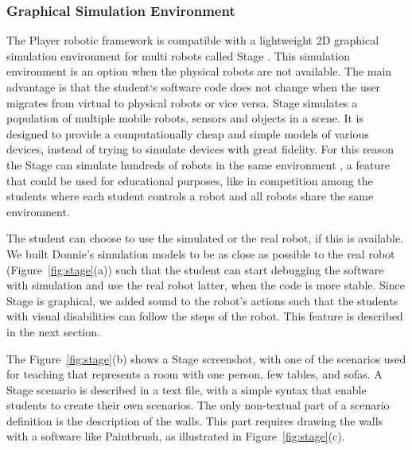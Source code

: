 


\subsubsection{Graphical Simulation Environment}
\label{sec:simul}

The Player robotic framework is compatible with a lightweight 2D graphical simulation environment for multi robots called Stage \cite{Vaughan:2008}. This simulation environment is an option when the physical robots are not available. The main advantage is that the student`s software code does not change when the user migrates from virtual to physical robots or vice versa.
Stage simulates a population of multiple mobile robots, sensors and objects in a scene. It is designed to provide a computationally cheap and simple models of various devices, instead of trying to simulate devices with great fidelity. For this reason the Stage can simulate hundreds of robots in the same environment \cite{Vaughan:2008}, a feature that could be used for educational purposes, like in competition among the students where each student controls a robot and all robots share the same environment. 

The student can choose to use the simulated or the real robot, if this is available. We built Donnie's simulation models to be as close as possible to the real robot (Figure~\ref{fig:stage}(a)) such that the student can start debugging the software with simulation and use the real robot latter, when the code is more stable. Since Stage is graphical, we added sound to the robot's actions such that the students with visual disabilities can follow the steps of the robot. This feature is described in the next section.

The Figure~\ref{fig:stage}(b) shows a Stage screenshot, with one of the scenarios used for teaching that represents a room with one person, few tables, and sofas. A Stage scenario is described in a text file, with a simple syntax that enable students to create their own scenarios. The only non-textual part of a scenario definition is the description of the walls. This part requires drawing the walls with a software like Paintbrush, as illustrated in Figure~\ref{fig:stage}(c). %


